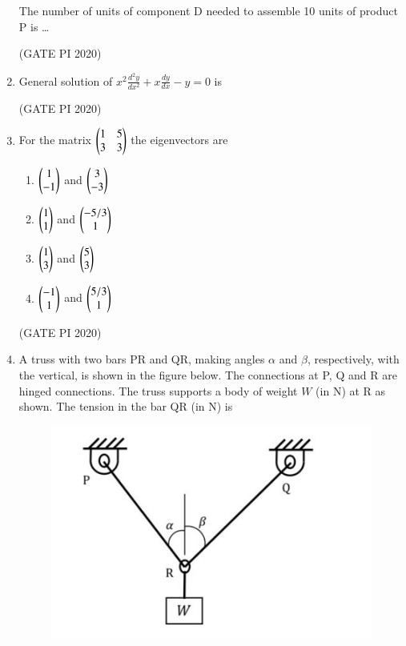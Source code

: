 \documentclass[journal,12pt,onecolumn]{IEEEtran}
\theoremstyle{remark}
\begin{document}
\begin{enumerate}
The number of units of component D needed to assemble 10 units of product P is \dots

\hfill (GATE PI 2020)

\item General solution of $x^2 \frac{d^2 y}{dx^2} + x \frac{dy}{dx} - y = 0$ is
\begin{enumerate}
\end{enumerate}

\hfill (GATE PI 2020)

\item For the matrix
$
\begin{pmatrix}
1 & 5 \\
3 & 3
\end{pmatrix}
$
the eigenvectors are
\begin{enumerate}
\item 
$
\begin{pmatrix}
1 \\
-1
\end{pmatrix}
$
and $
\begin{pmatrix}
3 \\
-3
\end{pmatrix}
$
\item 
  $
\begin{pmatrix}
1 \\
1
\end{pmatrix}
$
and $
\begin{pmatrix}
-5/3 \\
1
\end{pmatrix}
$
\item 
  $
\begin{pmatrix}
1 \\
3
\end{pmatrix}
$
and $
\begin{pmatrix}
5 \\
3
\end{pmatrix}
$
\item 
  $
\begin{pmatrix}
-1 \\
1
\end{pmatrix}
$
and $
\begin{pmatrix}
5/3 \\
1
\end{pmatrix}
$
\end{enumerate}

\hfill (GATE PI 2020)

\item A truss with two bars PR and QR, making angles $\alpha$ and $\beta$, respectively, with the vertical, is shown in the figure below. The connections at P, Q and R are hinged connections. The truss supports a body of weight $W$ (in N) at R as shown. The tension in the bar QR (in N) is

\begin{figure}[h]
    \centering
    \includegraphics[width=0.5\columnwidth]{figs/fig11.png}
    \caption{}
    \label{fig:placeholder}
\end{figure}


\end{enumerate}
\end{document}

